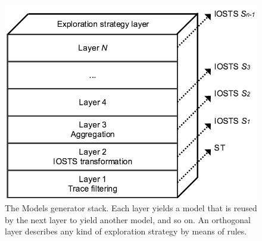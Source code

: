 \begin{figure}[ht]
    \begin{center}
        \includegraphics[width=1.0\linewidth]{figures/soict_se.png}
    \end{center}

    \caption {The Models generator stack. Each layer yields a
    model that is reused by the next layer to yield another
    model, and so on. An orthogonal layer describes any kind of
    exploration strategy by means of rules.}
    \label{fig:se}
\end{figure}

